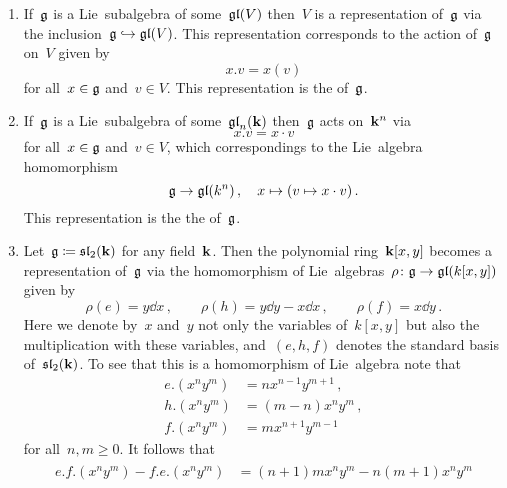 \begin{examples}
  \label{examples for representations}
  \leavevmode
  \begin{enumerate}
    \item 
      If~$\mathfrak{g}$ is a Lie~subalgebra of some~$\mathfrak{gl}(V)$ then~$V$ is a representation of~$\mathfrak{g}$ via the inclusion~$\mathfrak{g} \hookrightarrow \mathfrak{gl}(V)$.
      This representation corresponds to the action of~$\mathfrak{g}$ on~$V$ given by
      \[
        x.v
        =
        x(v)
      \]
      for all~$x \in \mathfrak{g}$ and~$v \in V$.
      This representation is the  of~$\mathfrak{g}$.
    \item
      If~$\mathfrak{g}$ is a Lie~subalgebra of some~$\mathfrak{gl}_n(\mathbf{k})$ then~$\mathfrak{g}$ acts on~$\mathbf{k}^n$ via
      \[
        x.v
        =
        x \cdot v
      \]
      for all~$x \in \mathfrak{g}$ and~$v \in V$, which correspondings to the Lie~algebra homomorphism
      \[
        \mathfrak{g}
        \to
        \mathfrak{gl}(k^n) \,,
        \quad
        x
        \mapsto
        (v \mapsto x \cdot v) \,.
      \]
      This representation is the the  of~$\mathfrak{g}$.
    \item
      Let~$\mathfrak{g} \coloneqq \mathfrak{sl}_2(\mathbf{k})$ for any field~$\mathbf{k}$.
      Then the polynomial ring~$\mathbf{k}[x,y]$ becomes a representation of~$\mathfrak{g}$ via the homomorphism of Lie~algebras~$\rho \colon \mathfrak{g} \to \mathfrak{gl}(k[x,y])$ given by
      \[
        \rho(e) = y \dd{x} \,,
        \qquad
        \rho(h) = y \dd{y} - x \dd{x} \,,
        \qquad
        \rho(f) = x \dd{y}  \,.
      \]
      Here we denote by~$x$ and~$y$ not only the variables of~$k[x,y]$ but also the multiplication with these variables, and~$(e,h,f)$ denotes the standard basis of~$\mathfrak{sl}_2(\mathbf{k})$.
      To see that this is a homomorphism of Lie~algebra note that
      \begin{align*}
        e.(x^n y^m)
        &=
        n x^{n-1} y^{m+1} \,, \\
        h.(x^n y^m)
        &=
        (m-n) x^n y^m \,, \\
        f.(x^n y^m)
        &=
        m x^{n+1} y^{m-1}
      \end{align*}
      for all~$n, m \geq 0$.
      It follows that
      \begin{gather*}
        \begin{aligned}
        e.f.(x^n y^m) - f.e.(x^n y^m)
        &=
        (n+1)m x^n y^m - n(m+1) x^n y^m
        \\

\end{aligned}
\end{gather*}
\end{enumerate}
\end{examples}
